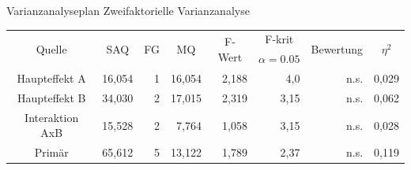 \documentclass{beamer}
\begin{document}
	\begin{frame}{Varianzanalyseplan}
		Zweifaktorielle Varianzanalyse\\
		\begin{table}[]
			\centering
			\resizebox{\textwidth}{!} {
			\begin{tabular}{|c|r|r|r|r|r|r|r|}
				\hline
				\multirow{2}{*}{Quelle} & \multicolumn{1}{c|}{\multirow{2}{*}{SAQ}} & \multicolumn{1}{c|}{\multirow{2}{*}{FG}} & \multicolumn{1}{c|}{\multirow{2}{*}{MQ}} & \multicolumn{1}{c|}{\multirow{2}{*}{F-Wert}} & \multicolumn{1}{c|}{F-krit}        & \multicolumn{1}{c|}{\multirow{2}{*}{Bewertung}} & \multicolumn{1}{c|}{\multirow{2}{*}{$\eta^2$}} \\
				& \multicolumn{1}{c|}{}                     & \multicolumn{1}{c|}{}                    & \multicolumn{1}{c|}{}                    & \multicolumn{1}{c|}{}                        & \multicolumn{1}{c|}{$\alpha=0.05$} & \multicolumn{1}{c|}{}                           & \multicolumn{1}{c|}{}                          \\ \hline
				Haupteffekt A           & 16,054                                    & 1                                        & 16,054                                   & 2,188                                        & 4,0                                & n.s.                                            & 0,029                                          \\ \hline
				Haupteffekt B           & 34,030                                    & 2                                        & 17,015                                   & 2,319                                        & 3,15                               & n.s.                                            & 0,062                                          \\ \hline
				Interaktion AxB         & 15,528                                    & 2                                        & 7,764                                    & 1,058                                        & 3,15                               & n.s.                                            & 0,028                                          \\ \hline
				Primär                  & 65,612                                    & 5                                        & 13,122                                   & 1,789                                        & 2,37                               & n.s.                                            & 0,119                                          \\ \hline

\end{tabular}}
\end{table}
\end{frame}
\end{document}
